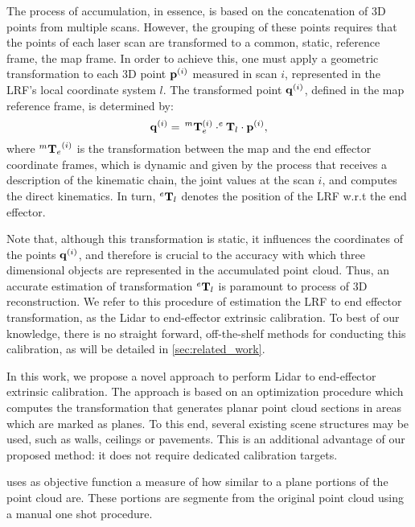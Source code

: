\documentclass[conference]{IEEEtran}
\begin{document}
The process of accumulation, in essence, is based on the concatenation of 3D points from multiple scans. However, the grouping of these points requires that the points of each laser scan are transformed to a common, static, reference frame, the map frame. In order to achieve this, one must apply a geometric transformation to each 3D point $\bold{p}^{(i)}$ measured in scan $i$, represented in the LRF's local coordinate system $l$. The transformed point $\bold{q}^{(i)}$, defined in the map reference frame, is determined by:
%
\begin{equation}
    \bold{q}^{(i)} = \, ^{m}\bold{T}_{e}^{(i)} \cdot ^{e}\bold{T}_{l} \cdot \bold{p}^{(i)},
\end{equation}
%
\noindent where ${^{m}\bold{T}_{e}}^{(i)}$ is the transformation between the map and the end effector coordinate frames, which is dynamic and given by the process that receives a description of the kinematic chain, the joint values at the scan $i$, and computes the direct kinematics. In turn, $^{e}\bold{T}_{l}$ denotes the position of the LRF w.r.t the end effector. 

Note that, although this transformation is static, it influences the coordinates of the points $\bold{q}^{(i)}$, and therefore is crucial to the accuracy with which three dimensional objects are represented in the accumulated point cloud.
Thus, an accurate estimation of transformation $^{e}\bold{T}_{l}$ is paramount to process of 3D reconstruction. We refer to this procedure of estimation the LRF to end effector transformation, as the Lidar to end-effector extrinsic calibration. 
To best of our knowledge, there is no straight forward, off-the-shelf methods for 
conducting this calibration, as will be detailed in \cref{sec:related_work}.


In this work, we propose a novel approach to perform Lidar to end-effector extrinsic calibration. The approach is based on an optimization procedure which computes the transformation that generates planar point cloud sections in areas which are marked as planes. To this end, several existing scene structures may be used, such as walls, ceilings or pavements. This is an additional advantage of our proposed method: it does not require dedicated calibration targets.

uses as objective function a measure of how similar to a plane portions of the point cloud are. These portions are segmente from the original point cloud using a manual one shot procedure. 
\end{document}
